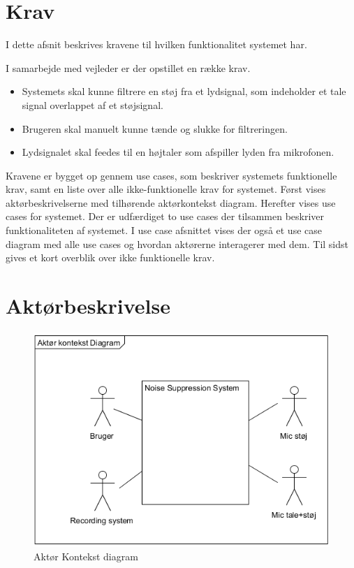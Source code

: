 \graphicspath{{Chapters/Krav/}}


\section{Krav}
I dette afsnit beskrives kravene til hvilken funktionalitet systemet har. 


I samarbejde med vejleder er der opstillet en række krav.
\begin{itemize}
\item Systemets skal kunne filtrere en støj fra et lydsignal, som indeholder et tale signal overlappet af et støjsignal.
\item Brugeren skal manuelt kunne tænde og slukke for filtreringen.
\item Lydsignalet skal feedes til en højtaler som afspiller lyden fra mikrofonen. 
\end{itemize}

Kravene er bygget op gennem use cases, som beskriver systemets funktionelle krav, samt en liste over alle ikke-funktionelle krav for systemet. Først vises aktørbeskrivelserne
med tilhørende aktørkontekst diagram. Herefter vises use cases for systemet. Der er udfærdiget to use cases
der tilsammen beskriver funktionaliteten af systemet. I use case afsnittet vises der også et use case diagram
med alle use cases og hvordan aktørerne interagerer med dem. Til sidst gives et kort overblik over ikke funktionelle krav.

\section{Aktørbeskrivelse}

\begin{figure}[H]
	\centering
	\includegraphics[width = 200 pt]{Img/Aktoer_Kontekst.png}
	\caption{Aktør Kontekst diagram}
	\label{fig:Aktoer Kontekst diagram}
\end{figure}

